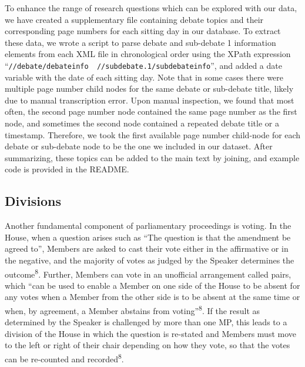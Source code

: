 \documentclass[
  letterpaper,
  DIV=11,
  numbers=noendperiod]{scrartcl}
\begin{document}
To enhance the range of research questions which can be explored with
our data, we have created a supplementary file containing debate topics
and their corresponding page numbers for each sitting day in our
database. To extract these data, we wrote a script to parse debate and
sub-debate 1 information elements from each XML file in chronological
order using the XPath expression
``\texttt{//debate/debateinfo\ \textbar{}\ //subdebate.1/subdebateinfo}'',
and added a date variable with the date of each sitting day. Note that
in some cases there were multiple page number child nodes for the same
debate or sub-debate title, likely due to manual transcription error.
Upon manual inspection, we found that most often, the second page number
node contained the same page number as the first node, and sometimes the
second node contained a repeated debate title or a timestamp. Therefore,
we took the first available page number child-node for each debate or
sub-debate node to be the one we included in our dataset. After
summarizing, these topics can be added to the main text by joining, and
example code is provided in the README.

\hypertarget{divisions}{%
\subsection{Divisions}\label{divisions}}

Another fundamental component of parliamentary proceedings is voting. In
the House, when a question arises such as ``The question is that the
amendment be agreed to'', Members are asked to cast their vote either in
the affirmative or in the negative, and the majority of votes as judged
by the Speaker determines the outcome\textsuperscript{8}. Further,
Members can vote in an unofficial arrangement called pairs, which ``can
be used to enable a Member on one side of the House to be absent for any
votes when a Member from the other side is to be absent at the same time
or when, by agreement, a Member abstains from
voting''\textsuperscript{8}. If the result as determined by the Speaker
is challenged by more than one MP, this leads to a division of the House
in which the question is re-stated and Members must move to the left or
right of their chair depending on how they vote, so that the votes can
be re-counted and recorded\textsuperscript{8}.
\end{document}
